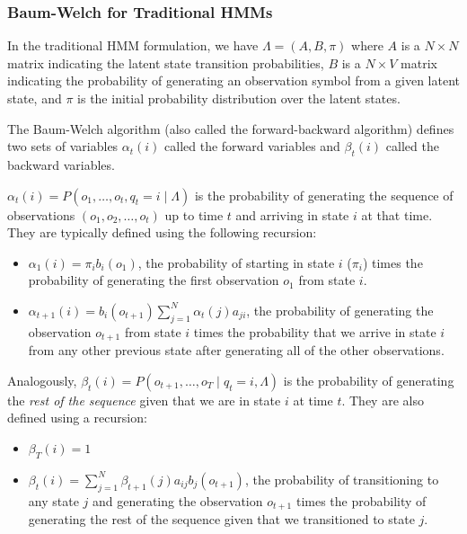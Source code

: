 \subsubsection{Baum-Welch for Traditional HMMs}
In the traditional HMM formulation, we have $\Lambda = (A, B, \pi)$ where
$A$ is a $N\times N$ matrix indicating the latent state transition
probabilities, $B$ is a $N \times V$ matrix indicating the probability of
generating an observation symbol from a given latent state, and $\pi$ is
the initial probability distribution over the latent states.

The Baum-Welch algorithm (also called the forward-backward algorithm)
defines two sets of variables $\alpha_t(i)$ called the forward variables
and $\beta_t(i)$ called the backward variables.

$\alpha_t(i) = P(o_1, \ldots, o_t, q_t = i \mid \Lambda)$ is the probability of
generating the sequence of observations $(o_1, o_2, \ldots, o_t)$ up to time
$t$ and arriving in state $i$ at that time. They are typically defined
using the following recursion:
\begin{itemize}
  \item $\alpha_1(i) = \pi_i b_i(o_1)$, the probability of starting in
    state $i$ ($\pi_i$) times the probability of generating the first
    observation $o_1$ from state $i$.
  \item $\alpha_{t+1}(i) = b_i(o_{t+1})\sum_{j=1}^N \alpha_t(j) a_{ji}$,
    the probability of generating the observation $o_{t+1}$ from state $i$
    times the probability that we arrive in state $i$ from any other
    previous state after generating all of the other observations.
\end{itemize}

Analogously, $\beta_t(i) = P(o_{t+1}, \ldots, o_{T} \mid q_t = i, \Lambda)$
is the probability of generating the \emph{rest of the sequence} given that
we are in state $i$ at time $t$. They are also defined using a recursion:
\begin{itemize}
  \item $\beta_T(i) = 1$
  \item $\beta_t(i) = \sum_{j=1}^N \beta_{t+1}(j) a_{ij} b_j(o_{t+1})$, the
    probability of transitioning to any state $j$ and generating the
    observation $o_{t+1}$ times the probability of generating the rest of
    the sequence given that we transitioned to state $j$.
\end{itemize}

